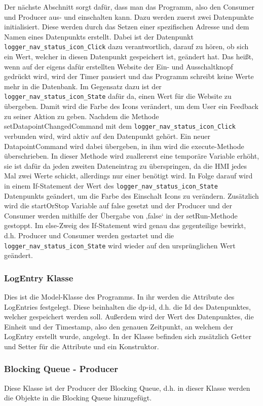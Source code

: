 Der nächste Abschnitt sorgt dafür, dass man das Programm, also den Consumer und Producer aus- und einschalten kann. Dazu werden zuerst zwei Datenpunkte initialisiert. Diese werden durch das Setzen einer spezifischen Adresse und dem Namen eines Datenpunkts erstellt. Dabei ist der Datenpunkt \texttt{logger\_nav\_status\_icon\_Click} dazu verantwortlich, darauf zu hören, ob sich ein Wert, welcher in diesen Datenpunkt gespeichert ist, geändert hat. Das heißt, wenn auf der eigens dafür erstellten Website der Ein- und Ausschaltknopf gedrückt wird, wird der Timer pausiert und das Programm schreibt keine Werte mehr in die Datenbank. Im Gegensatz dazu ist der \texttt{logger\_nav\_status\_icon\_State} dafür da, einen Wert für die Website zu übergeben. Damit wird die Farbe des Icons verändert, um dem User ein Feedback zu seiner Aktion zu geben.
Nachdem die Methode setDatapointChangedCommand mit dem \texttt{logger\_nav\_status\_icon\_Click} verbunden wird, wird aktiv auf den Datenpunkt gehört. Ein neuer DatapointCommand wird dabei übergeben, in ihm wird die execute-Methode überschrieben. In dieser Methode wird zuallererst eine temporäre Variable erhöht, sie ist dafür da jeden zweiten Dateneintrag zu überspringen, da die HMI jedes Mal zwei Werte schickt, allerdings nur einer benötigt wird. In Folge darauf wird in einem If-Statement der Wert des \texttt{logger\_nav\_status\_icon\_State} Datenpunkts geändert, um die Farbe des Einschalt Icons zu verändern. Zusätzlich wird die startOrStop Variable auf false gesetzt und der Producer und der Consumer werden mithilfe der Übergabe von ‚false‘ in der setRun-Methode gestoppt. Im else-Zweig des If-Statement wird genau das gegenteilige bewirkt, d.h. Producer und Consumer werden gestartet und die \texttt{logger\_nav\_status\_icon\_State} wird wieder auf den ursprünglichen Wert geändert. 

\subsubsection{LogEntry Klasse}
Dies ist die Model-Klasse des Programms. In ihr werden die Attribute des LogEntries festgelegt. Diese beinhalten die dp-id, d.h. die Id des Datenpunktes, welcher gespeichert werden soll. Außerdem wird der Wert des Datenpunktes, die Einheit und der Timestamp, also den genauen Zeitpunkt, an welchem der LogEntry erstellt wurde, angelegt. In der Klasse befinden sich zusätzlich Getter und Setter für die Attribute und ein Konstruktor. 

\subsubsection{Blocking Queue - Producer }
Diese Klasse ist der Producer der Blocking Queue, d.h. in dieser Klasse werden die Objekte in die Blocking Queue hinzugefügt. 


